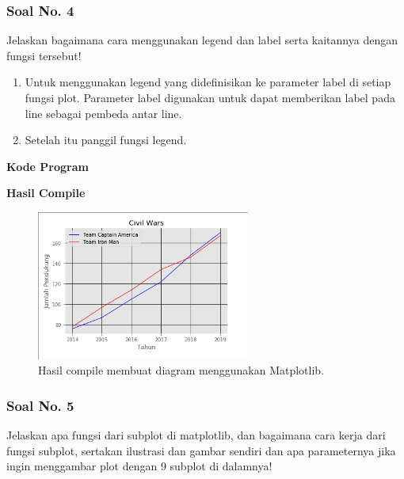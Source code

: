 \subsubsection{Soal No. 4}
\hfill \break
Jelaskan bagaimana cara menggunakan legend dan label serta kaitannya dengan fungsi tersebut!

\begin{enumerate}
	\item Untuk menggunakan legend yang didefinisikan ke parameter label di setiap fungsi plot. Parameter label digunakan untuk dapat memberikan label pada line sebagai pembeda antar line.
	
	
	
	\item Setelah itu panggil fungsi legend.
	
	
\end{enumerate}

\hfill \break
\textbf{Kode Program}



\hfill \break
\textbf{Hasil Compile}

\begin{figure}[H]
	\includegraphics[width=7cm]{figures/6/1144124/4.png}
	\centering
	\caption{Hasil compile membuat diagram menggunakan Matplotlib.}
\end{figure}

\subsubsection{Soal No. 5}
\hfill \break
Jelaskan apa fungsi dari subplot di matplotlib, dan bagaimana cara kerja dari fungsi subplot, sertakan ilustrasi dan gambar sendiri dan apa parameternya jika ingin menggambar plot dengan 9 subplot di dalamnya!


